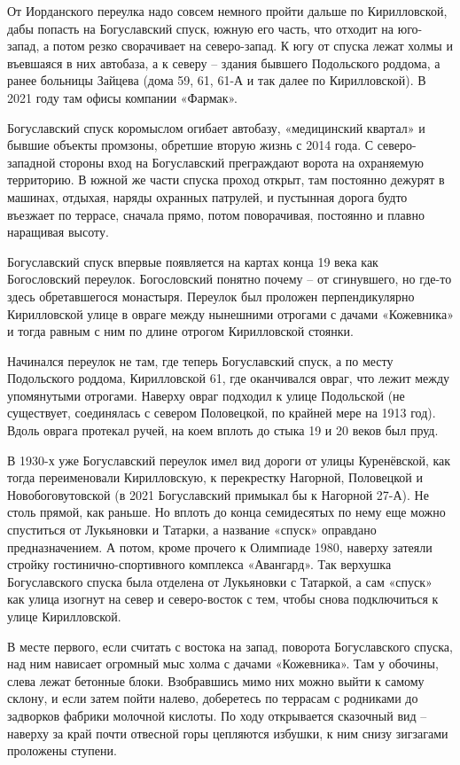 От Иорданского переулка надо совсем немного пройти дальше по Кирилловской, дабы попасть на Богуславский спуск, южную его часть, что отходит на юго-запад, а потом резко сворачивает на северо-запад. К югу от спуска лежат холмы и въевшаяся в них автобаза, а к северу – здания бывшего Подольского роддома, а ранее больницы Зайцева (дома 59, 61, 61-А и так далее по Кирилловской). В 2021 году там офисы компании «Фармак».

Богуславский спуск коромыслом огибает автобазу, «медицинский квартал» и бывшие объекты промзоны, обретшие вторую жизнь с 2014 года. С северо-западной стороны вход на Богуславский преграждают ворота на охраняемую территорию. В южной же части спуска проход открыт, там постоянно дежурят в машинах, отдыхая, наряды охранных патрулей, и пустынная дорога будто въезжает по террасе, сначала прямо, потом поворачивая, постоянно и плавно наращивая высоту.

Богуславский спуск впервые появляется на картах конца 19 века как Богословский переулок. Богословский понятно почему – от сгинувшего, но где-то здесь обретавшегося монастыря. Переулок был проложен перпендикулярно Кирилловской улице в овраге между нынешними отрогами с дачами «Кожевника» и тогда равным с ним по длине отрогом Кирилловской стоянки. 

Начинался переулок не там, где теперь Богуславский спуск, а по месту Подольского роддома, Кирилловской 61, где оканчивался овраг, что лежит между упомянутыми отрогами. Наверху овраг подходил к улице Подольской (не существует, соединялась с севером Половецкой, по крайней мере на 1913 год). Вдоль оврага протекал ручей, на коем вплоть до стыка 19 и 20 веков был пруд. 

В 1930-х уже Богуславский переулок имел вид дороги от улицы Куренёвской, как тогда переименовали Кирилловскую, к перекрестку Нагорной, Половецкой и Новобоговутовской (в 2021 Богуславский примыкал бы к Нагорной 27-А). Не столь прямой, как раньше. Но вплоть до конца семидесятых по нему еще можно спуститься от Лукьяновки и Татарки, а название «спуск» оправдано предназначением. А потом, кроме прочего к Олимпиаде 1980, наверху затеяли стройку гостинично-спортивного комплекса «Авангард». Так верхушка Богуславского спуска была отделена от Лукьяновки с Татаркой, а сам «спуск» как улица изогнут на север и северо-восток с тем, чтобы снова подключиться к улице Кирилловской. 

В месте первого, если считать с востока на запад, поворота Богуславского спуска, над ним нависает огромный мыс холма с дачами «Кожевника». Там у обочины, слева лежат бетонные блоки. Взобравшись мимо них можно выйти к самому склону, и если затем пойти налево, доберетесь по террасам с родниками до задворков фабрики молочной кислоты. По ходу открывается сказочный вид – наверху за край почти отвесной горы цепляются избушки, к ним снизу зигзагами проложены ступени.

